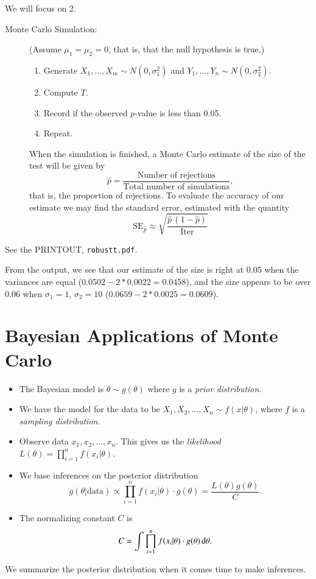 \documentclass[captions=tableheading]{scrbook}
\begin{document}
We will focus on 2.


\begin{description}
\item[Monte Carlo Simulation:] (Assume $\mu_{1}=\mu_{2}=0$, that is, that the null hypothesis is true.)
\begin{enumerate}
\item Generate $X_{1},\ldots,X_{m}\sim N(0,\sigma_{1}^{2})$ and $Y_{1},\ldots,Y_{n}\sim N(0,\sigma_{2}^{2})$.
\item Compute $T$.
\item Record if the observed \(p\)-value is less than 0.05.
\item Repeat.
\end{enumerate}
When the simulation is finished, a Monte Carlo estimate of the size of the test will be given by
  \[
  \hat{p}=\frac{\mbox{Number of rejections}}{\mbox{Total number of simulations}},
  \]
  that is, the proportion of rejections. To evaluate the accuracy of our estimate we may find the standard error, estimated with the quantity
  \[
  \mathrm{SE}_{\hat{p}} \approx \sqrt{\frac{\hat{p}\,(1-\hat{p})}{\mathrm{Iter}}}
  \]
\end{description}

See the PRINTOUT, \texttt{robustt.pdf}.

From the output, we see that our estimate of the size is right at 0.05 when the variances are equal ($0.0502-2*0.0022=0.0458$), and the size appears to be over 0.06 when $\sigma_{1}=1$, $\sigma_{2}=10$ ($0.0659-2*0.0025=0.0609$).  
\section{Bayesian Applications of Monte Carlo}
\label{sec-3_3}



\begin{itemize}
\item The Bayesian model is \(\theta \sim g(\theta) \) where $g$ is a \emph{prior distribution}.
\item We have the model for the data to be  \(X_{1},X_{2},\ldots, X_{n}\sim f(x|\theta)\), where $f$ is a \emph{sampling distribution}.
\item Observe data \(x_{1},x_{2},\ldots,x_{n}\).  This gives us the \emph{likelihood} \( L(\theta) =  \prod_{i=1}^{n}f(x_{i}|\theta)\).
\item We base inferences on the posterior distribution
  \[
  g(\theta | \mbox{data}) \propto \prod_{i=1}^{n}f(x_{i}|\theta)\cdot g(\theta) = \frac{L(\theta)g(\theta)}{C}.
  \]
\item The normalizing constant $C$ is
  \[
  C = \int \prod_{i=1}^{n}f(x_{i}|\theta)\cdot g(\theta)\,\mathrm{d} \theta.
  \]
\end{itemize}
We summarize the posterior distribution when it comes time to make inferences.
\end{document}
